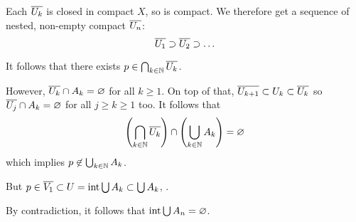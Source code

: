 \documentclass[a4paper, 12pt]{article}
\begin{document}
\begin{solution}
    Each $\overline{U_k}$ is closed in compact $X$, so is compact. We therefore get a sequence of nested, non-empty compact $\overline{U_n}$:
    \begin{equation*}
    \overline{U_1} \supset \overline{U_2} \supset \ldots
    \end{equation*}

    It follows that there exists $p \in \bigcap_{k \in \mathbb{N}} \overline{U_k}$.

    However, $\overline{U_k} \cap A_k = \varnothing$ for all $k \geq 1$. On top of that, $\overline{U_{k+1}} \subset U_k \subset \overline{U_k}$ so $\overline{U_j} \cap A_k = \varnothing$ for all $j \geq k \geq 1$ too. It follows that \begin{equation*}
       \left( \bigcap_{k \in \mathbb{N}} \overline{U_k}\right) \cap \left(\bigcup_{k \in \mathbb{N}} A_k\right) = \varnothing
    \end{equation*}
    which implies $p \not \in \bigcup_{k \in \mathbb{N}} A_k$. 
    
    But $p \in \overline{V_1} \subset U = \operatorname*{int} \bigcup A_k \subset \bigcup A_k$, \contra.

    By contradiction, it follows that $\operatorname*{int} \bigcup A_n = \varnothing$.
\end{solution}
\end{document}
